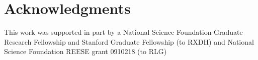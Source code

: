 \documentclass[10pt,letterpaper]{article}
\begin{document}
\section*{Acknowledgments}
This work was supported in part by a National Science Foundation Graduate Research Fellowship and Stanford Graduate Fellowship (to RXDH) and National Science Foundation REESE grant 0910218 (to RLG)

\nolinenumbers

%
%
% 
\end{document}

